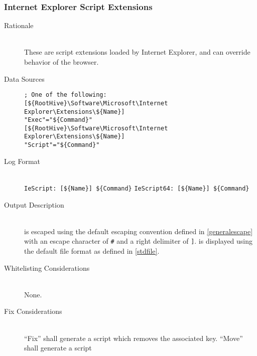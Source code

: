 \subsubsection{Internet Explorer Script Extensions}
\begin{description}
\item[Rationale] \hfill \\
These are script extensions loaded by Internet Explorer, and can override
behavior of the browser.
\item[Data Sources] \hfill
\begin{verbatim}
; One of the following:
[${RootHive}\Software\Microsoft\Internet Explorer\Extensions\${Name}]
"Exec"="${Command}"
[${RootHive}\Software\Microsoft\Internet Explorer\Extensions\${Name}]
"Script"="${Command}"
\end{verbatim}
\item[Log Format] \hfill \\
\verb|IeScript: [${Name}] ${Command}|
\verb|IeScript64: [${Name}] ${Command}|
\item[Output Description] \hfill \\
 is escaped using the default escaping convention defined in
\ref{generalescape} with an escape character of \verb|#| and a right delimiter
of \verb|]|.  is displayed using the default file format as defined
in \ref{stdfile}.
\item[Whitelisting Considerations] \hfill \\
None.
\item[Fix Considerations] \hfill \\
``Fix'' shall generate a script which removes the associated key. ``Move'' shall
generate a script
\end{description}


